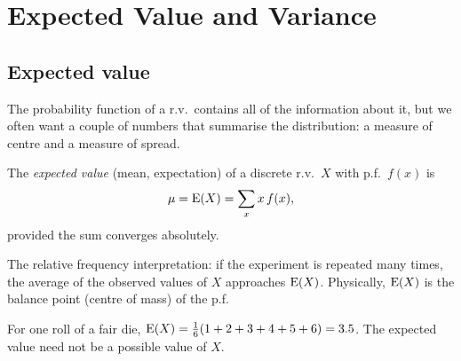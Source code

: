 \chapter{Expected Value and Variance}

\section{Expected value}

The probability function of a r.v.\ contains all of the information about it, but we often
want a couple of numbers that summarise the distribution: a measure of centre and a
measure of spread.

\begin{definition}
The \emph{expected value} (mean, expectation) of a discrete r.v.\ $X$ with p.f.\ $f(x)$ is
\[
  \mu = \operatorname{E}(X) = \sum_{x} x\,f(x),
\]
provided the sum converges absolutely.
\end{definition}

The relative frequency interpretation: if the experiment is repeated many times, the
average of the observed values of $X$ approaches $\operatorname{E}(X)$. Physically, $\operatorname{E}(X)$ is the
balance point (centre of mass) of the p.f.

\begin{center}
\end{center}

\begin{example}
For one roll of a fair die, $\operatorname{E}(X) = \frac16(1+2+3+4+5+6) = 3.5$. The expected value need
not be a possible value of $X$.
\end{example}

